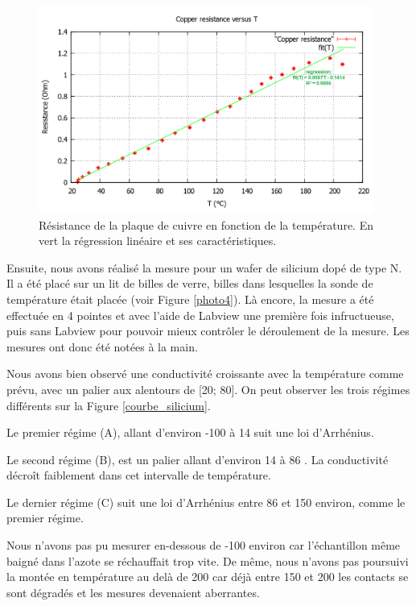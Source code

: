 \begin{figure}[!b]
  \begin{center}
		\includegraphics[width=11cm]{./images/Resistance_Cuivre_finale_english.png}
		\caption{Résistance de la plaque de cuivre en fonction de la température. En vert la régression linéaire et ses caractéristiques.}
		\label{courbe_cuivre}
	\end{center}
\end{figure}

\newpage

Ensuite, nous avons réalisé la mesure pour un wafer de silicium dopé de type N. Il a été placé sur un lit de billes de verre, billes dans lesquelles la sonde de température était placée (voir Figure \ref{photo4}). Là encore, la mesure a été effectuée en 4 pointes et avec l'aide de Labview une première fois infructueuse, puis sans Labview pour pouvoir mieux contrôler le déroulement de la mesure. Les mesures ont donc été notées à la main.

Nous avons bien observé une conductivité croissante avec la température comme prévu, avec un palier aux alentours de [20\celsius{}; 80\celsius{}]. On peut observer les trois régimes différents sur la Figure \ref{courbe_silicium}.

Le premier régime (A), allant d'environ -100 \celsius{} à 14 \celsius{} suit une loi d'Arrhénius.

Le second régime (B), est un palier allant d'environ 14 \celsius{} à 86 \celsius{}. La conductivité décroît faiblement dans cet intervalle de température.

Le dernier régime (C) suit une loi d'Arrhénius entre 86 \celsius{} et 150 \celsius{} environ, comme le premier régime.

Nous n'avons pas pu mesurer en-dessous de -100 \celsius{} environ car l'échantillon même baigné dans l'azote se réchauffait trop vite. De même, nous n'avons pas poursuivi la montée en température au delà de 200 \celsius{} car déjà entre 150 \celsius{} et 200 \celsius{} les contacts se sont dégradés et les mesures devenaient aberrantes.

